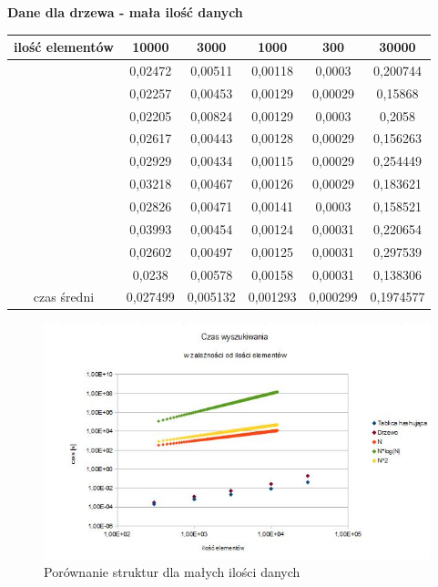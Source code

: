 \documentclass[12pt,a4paper,titlepage]{article}
\begin{document}
\begin{center}
\textbf{Dane dla drzewa - mała ilość danych}
\begin {tabular}{|c|c|c|c|c|c|}\hline
ilość elementów&10000&3000&1000&300&30000\\\hline
&0,02472&0,00511&0,00118&0,0003&0,200744\\\hline
&0,02257&0,00453&0,00129&0,00029&0,15868\\\hline
&0,02205&0,00824&0,00129&0,0003&0,2058\\\hline
&0,02617&0,00443&0,00128&0,00029&0,156263\\\hline
&0,02929&0,00434&0,00115&0,00029&0,254449\\\hline
&0,03218&0,00467&0,00126&0,00029&0,183621\\\hline
&0,02826&0,00471&0,00141&0,0003&0,158521\\\hline
&0,03993&0,00454&0,00124&0,00031&0,220654\\\hline
&0,02602&0,00497&0,00125&0,00031&0,297539\\\hline
&0,0238&0,00578&0,00158&0,00031&0,138306\\\hline
czas średni&0,027499&0,005132&0,001293&0,000299&0,1974577\\\hline

\end{tabular}
\end {center}


\begin{figure}[h]
\begin{center}
\includegraphics[scale=0.5]{wyszukiwanie_male.jpg}
\caption{Porównanie struktur dla małych ilości danych}
\end{center}
\end{figure}
\end{document}
